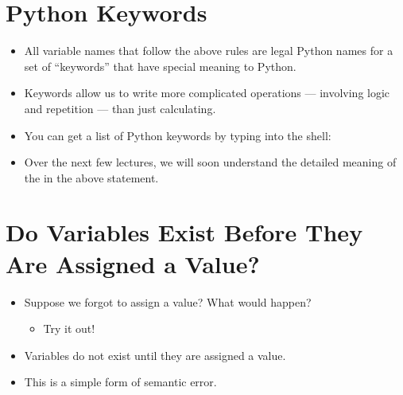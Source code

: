 \documentclass[letterpaper,10pt,english]{sphinxmanual}
\begin{document}
\section{Python Keywords}
\label{\detokenize{lecture_notes/lec02_calculator:python-keywords}}\begin{itemize}
\item {} 
All variable names that follow the above rules are legal Python
names  for a set of “keywords” that have special
meaning to Python.

\item {} 
Keywords allow us to write more complicated operations
— involving logic and repetition — than just calculating.

\item {} 
You can get a list of Python keywords by typing into the shell:

\begin{sphinxVerbatim}[commandchars=\\\{\}]
 
\end{sphinxVerbatim}

\item {} 
Over the next few lectures, we will soon understand the detailed
meaning of the  in the above statement.

\end{itemize}


\section{Do Variables Exist Before They Are Assigned a Value?}
\label{\detokenize{lecture_notes/lec02_calculator:do-variables-exist-before-they-are-assigned-a-value}}\begin{itemize}
\item {} 
Suppose we forgot to assign  a value? What would happen?
\begin{itemize}
\item {} 
Try it out!

\end{itemize}

\item {} 
Variables do not exist until they are assigned a value.

\item {} 
This is a simple form of semantic error.

\end{itemize}
\end{document}
